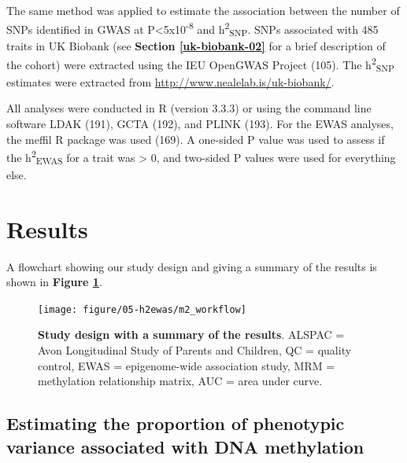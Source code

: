 \documentclass[11pt,twoside]{bristolthesis}
\begin{document}
The same method was applied to estimate the association between the number of SNPs identified in GWAS at P\textless5x10\textsuperscript{-8} and h\textsuperscript{2}\textsubscript{SNP}. SNPs associated with 485 traits in UK Biobank (see \textbf{Section \ref{uk-biobank-02}} for a brief description of the cohort) were extracted using the IEU OpenGWAS Project (105). The h\textsuperscript{2}\textsubscript{SNP} estimates were extracted from \url{http://www.nealelab.is/uk-biobank/}.

All analyses were conducted in R (version 3.3.3) or using the command line software LDAK (191), GCTA (192), and PLINK (193). For the EWAS analyses, the meffil R package was used (169). A one-sided P value was used to assess if the h\textsuperscript{2}\textsubscript{EWAS} for a trait was \textgreater{} 0, and two-sided P values were used for everything else.

\hypertarget{results-05}{%
\section{Results}\label{results-05}}

A flowchart showing our study design and giving a summary of the results is shown in \textbf{Figure \ref{fig:h2ewas-study-design}}.




\begin{figure}

{\centering \texttt{[image: figure/05-h2ewas/m2\_workflow]} 

}

\caption[Study design with a summary of the results]{\textbf{Study design with a summary of the results}. ALSPAC = Avon Longitudinal Study of Parents and Children, QC = quality control, EWAS = epigenome-wide association study, MRM = methylation relationship matrix, AUC = area under curve.}\label{fig:h2ewas-study-design}
\end{figure}
\hypertarget{estimating-h2ewas}{%
\subsection{Estimating the proportion of phenotypic variance associated with DNA methylation}\label{estimating-h2ewas}}
\end{document}
